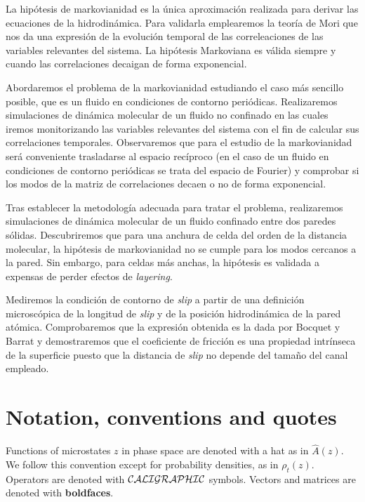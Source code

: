 \documentclass[b5paper,openright,10pt]{book}
\begin{document}
La hipótesis de markovianidad es la única aproximación realizada para derivar las ecuaciones de la hidrodinámica. Para validarla emplearemos la teoría de Mori que nos da una expresión de la evolución temporal de las correleaciones de las variables relevantes del sistema. La hipótesis Markoviana es válida siempre y cuando las correlaciones decaigan de forma exponencial.

Abordaremos el problema de la markovianidad estudiando el caso más sencillo posible, que es un fluido en condiciones de contorno periódicas. Realizaremos simulaciones de dinámica molecular de un fluido no confinado en las cuales iremos monitorizando las variables relevantes del sistema con el fin de calcular sus correlaciones temporales. 
Observaremos que para el estudio de la markovianidad será conveniente trasladarse al espacio recíproco (en el caso de un fluido en condiciones de contorno periódicas se trata del espacio de Fourier) y comprobar si los modos de la matriz de correlaciones decaen o no de forma exponencial. 

Tras establecer la metodología adecuada para tratar el problema, realizaremos simulaciones de dinámica molecular de un fluido confinado entre dos paredes sólidas. Descubriremos que para una anchura de celda del orden de la distancia molecular, la hipótesis de markovianidad no se cumple para los modos cercanos a la pared. Sin embargo, para celdas más anchas, la hipótesis es validada a expensas de perder efectos de \textit{layering}. 

Mediremos la condición de contorno de \textit{slip} a partir de una definición microscópica de la longitud de \textit{slip} y de la posición hidrodinámica de la pared atómica. Comprobaremos que la expresión obtenida es la dada por Bocquet y Barrat \cite{Bocquet1994} y demostraremos que el coeficiente de fricción es una propiedad intrínseca de la superficie puesto que la distancia de \textit{slip} no depende del tamaño del canal empleado. 


\chapter*{Notation, conventions and quotes}

Functions of microstates $z$ in phase space are denoted with a hat as in $\hat{A}(z)$. We follow this convention except for probability densities, as in $\rho_t(z)$. Operators are denoted with ${\cal CALIGRAPHIC}$ symbols. Vectors and matrices are denoted with {\bf boldfaces}.
\end{document}
